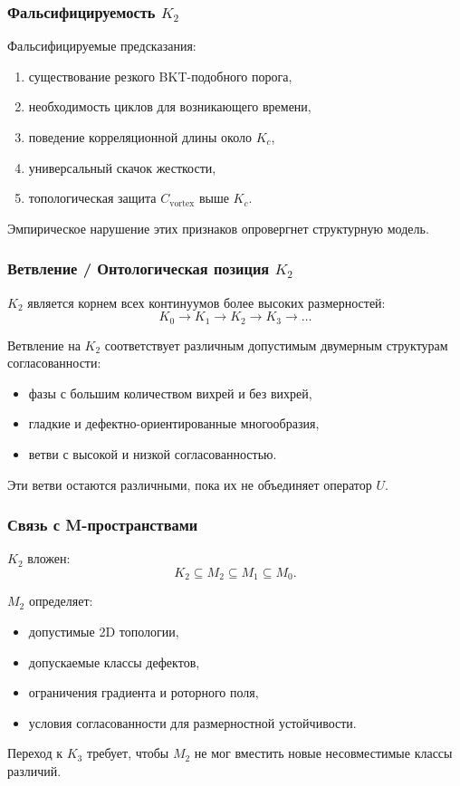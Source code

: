 \subsubsection{Фальсифицируемость \texorpdfstring{$K_2$}{K_2}}

Фальсифицируемые предсказания:
\begin{enumerate}
    \item существование резкого BKT-подобного порога,
    \item необходимость циклов для возникающего времени,
    \item поведение корреляционной длины около $K_c$,
    \item универсальный скачок жесткости,
    \item топологическая защита $C_{\mathrm{vortex}}$ выше $K_c$.
\end{enumerate}

Эмпирическое нарушение этих признаков опровергнет структурную
модель.

\subsubsection{Ветвление / Онтологическая позиция \texorpdfstring{$K_2$}{K_2}}

$K_2$ является корнем всех континуумов более высоких размерностей:
\[
K_0 \to K_1 \to K_2 \to K_3 \to \dots
\]

Ветвление на $K_2$ соответствует различным допустимым двумерным
структурам согласованности:
\begin{itemize}
    \item фазы с большим количеством вихрей и без вихрей,
    \item гладкие и дефектно-ориентированные многообразия,
    \item ветви с высокой и низкой согласованностью.
\end{itemize}

Эти ветви остаются различными, пока их не объединяет оператор $U$.

\subsubsection{Связь с M-пространствами}

$K_2$ вложен:
\[
K_2 \subseteq M_2 \subseteq M_1 \subseteq M_0.
\]

$M_2$ определяет:
\begin{itemize}
    \item допустимые 2D топологии,
    \item допускаемые классы дефектов,
    \item ограничения градиента и роторного поля,
    \item условия согласованности для размерностной устойчивости.
\end{itemize}

Переход к $K_3$ требует, чтобы $M_2$ не мог вместить новые
несовместимые классы различий.
